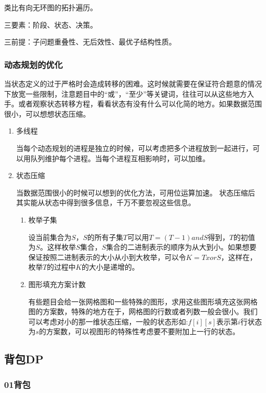 \documentclass[11pt]{article}
\begin{document}
类比有向无环图的拓扑遍历。

三要素：阶段、状态、决策。

三前提：子问题重叠性、无后效性、最优子结构性质。

\subsubsection{动态规划的优化}
\label{sec:org93933e2}

当状态定义的过于严格时会造成转移的困难。这时候就需要在保证符合题意的情况下放宽一些限制，注意题目中的“或”，“至少”等关键词，往往可以从这些地方入手。或者观察状态转移方程，看看状态有没有什么可以化简的地方。如果数据范围很小，可以想想状态压缩。
\begin{enumerate}
\item 多线程
\label{sec:org6967e57}

当每个动态规划的进程是独立的时候，可以考虑把多个进程放到一起进行，可以用队列维护每个进程。当每个进程互相影响时，可以加维。
\item 状态压缩
\label{sec:org870dc44}

当数据范围很小的时候可以想到的优化方法，可用位运算加速。
状态压缩后其实能从状态中得到很多信息，千万不要忽视这些信息。

\begin{enumerate}
\item 枚举子集
\label{sec:org0bfc5f7}

设当前集合为\(S\)，\(S\)的所有子集\(T\)可以用\(T=(T-1) and S\)得到，\(T\)的初值为\(S\)。这样枚举\(S\)集合，\(S\)集合的二进制表示的顺序为从大到小。如果想要保证按照二进制表示的大小从小到大枚举，可以令\(K=TxorS\)，这样在，枚举\(T\)的过程中\(K\)的大小是递增的。 

\item 图形填充方案计数
\label{sec:org41b70c7}

有些题目会给一张网格图和一些特殊的图形，求用这些图形填充这张网格图的方案数，特殊的地方在于，网格图的行数或者列数一般会很小。我们可以考虑对小的那一维状态压缩，一般的状态形如:\(f[i][s]\)表示第\(i\)行状态为\(s\)的方案数，可以视图形的特殊性考虑要不要附加上一行的状态。
\end{enumerate}
\end{enumerate}

\subsection{背包DP}
\label{sec:orgdaffd66}
\subsubsection{01背包}
\label{sec:orgba290af}
\end{document}
